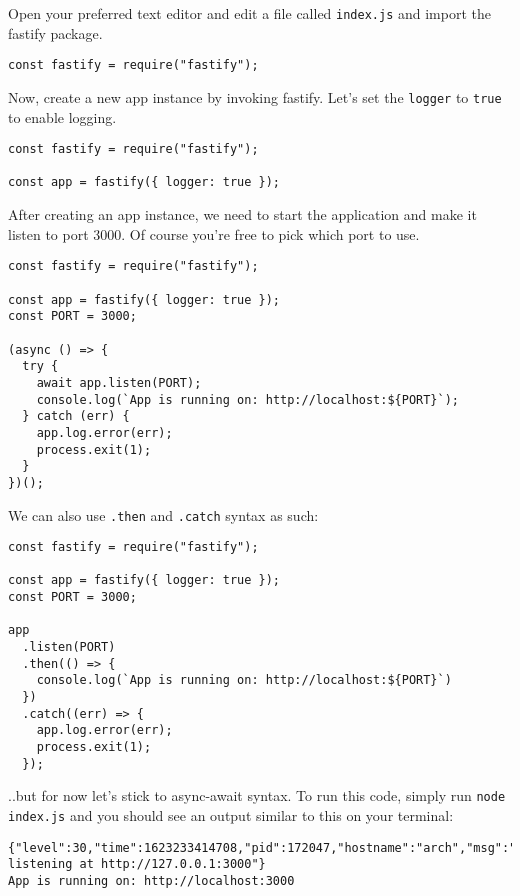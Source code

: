 \documentclass[a4paper,14pt,titlepage]{article}
\def\c#1{\texttt{#1}}
\begin{document}
Open your preferred text editor and edit a file called
\c{index.js} and import the fastify package.

\begin{verbatim}
const fastify = require("fastify");
\end{verbatim}

Now, create a new app instance by invoking fastify. Let's set the
\c{logger} to
\c{true} to enable logging.

\begin{verbatim}
const fastify = require("fastify");

const app = fastify({ logger: true });
\end{verbatim}

After creating an app instance, we need to start the application and make it
listen to port 3000. Of course you're free to pick which port to use.

\begin{verbatim}
const fastify = require("fastify");

const app = fastify({ logger: true });
const PORT = 3000;

(async () => {
  try {
    await app.listen(PORT);
    console.log(`App is running on: http://localhost:${PORT}`);
  } catch (err) {
    app.log.error(err);
    process.exit(1);
  }
})();
\end{verbatim}

\newpage

We can also use \texttt{.then} and
\texttt{.catch} syntax as such:

\begin{verbatim}
const fastify = require("fastify");

const app = fastify({ logger: true });
const PORT = 3000;

app
  .listen(PORT)
  .then(() => {
    console.log(`App is running on: http://localhost:${PORT}`)
  })
  .catch((err) => {
    app.log.error(err);
    process.exit(1);
  });
\end{verbatim}

..but for now let's stick to async-await syntax.  To run this code,
simply run \c{node index.js} and you should see an output similar to this
on your terminal:

\begin{verbatim}
{"level":30,"time":1623233414708,"pid":172047,"hostname":"arch","msg":"Server listening at http://127.0.0.1:3000"}
App is running on: http://localhost:3000
\end{verbatim}
\end{document}
